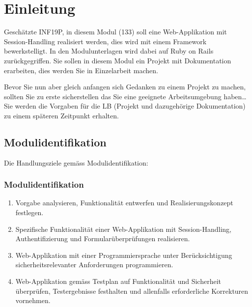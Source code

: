 \mode*


\section{Einleitung}
\label{sec:einleitung}

\begin{frame}[fragile]
    Geschätzte INF19P, in diesem Modul (133) soll eine Web-Applikation mit Session-Handling realisiert werden, dies wird
    mit einem Framework bewerkstelligt.
    In den Modulunterlagen wird dabei auf Ruby on Rails zurückgegriffen.
    Sie sollen in diesem Modul ein Projekt mit Dokumentation erarbeiten, dies werden Sie in Einzelarbeit machen.

    Bevor Sie nun aber gleich anfangen sich Gedanken zu einem Projekt zu machen, sollten Sie zu erste sicherstellen das
    Sie eine geeignete Arbeitsumgebung haben\ldots\space
    Sie werden die Vorgaben für die LB (Projekt und dazugehörige Dokumentation) zu einem späteren Zeitpunkt erhalten.
\end{frame}

\subsection{Modulidentifikation}
\label{subsec:modulid}
Die Handlungsziele gemäss Modulidentifikation:
\begin{frame}[fragile]
    \frametitle<presentation>{Modulidentifikation}
    \begin{enumerate}
        \item Vorgabe analysieren, Funktionalität entwerfen und
        Realisierungskonzept festlegen.
        \item Spezifische Funktionalität einer Web-Applikation mit Session-Handling,
        Authentifizierung und Formularüberprüfungen realisieren.
        \item Web-Applikation mit einer Programmiersprache unter
        Berücksichtigung sicherheitsrelevanter Anforderungen
        programmieren.
        \item Web-Applikation gemäss Testplan auf Funktionalität und
        Sicherheit überprüfen, Testergebnisse festhalten und
        allenfalls erforderliche Korrekturen vornehmen.
    \end{enumerate}
\end{frame}

